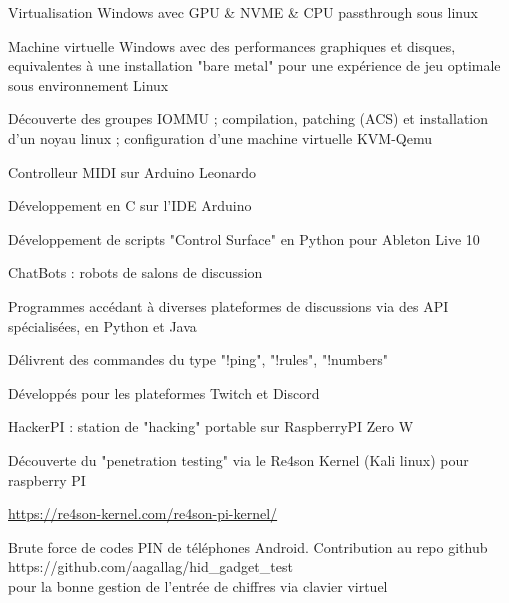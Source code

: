 \begin{cventries}
  \cventry
    {} %
    {Virtualisation Windows avec GPU \& NVME \& CPU passthrough sous linux} %
    {} %
    {} %
    {
      \begin{cvitems} %
        \item {Machine virtuelle Windows avec des performances graphiques et disques, equivalentes à une installation "bare metal" pour une expérience de jeu optimale sous environnement Linux}
        \item {Découverte des groupes IOMMU ; compilation, patching (ACS) et installation d'un noyau linux ; configuration d'une machine virtuelle KVM-Qemu\\}
      \end{cvitems}
    }
  \cventry
    {} %
    {Controlleur MIDI sur Arduino Leonardo} %
    {} %
    {} %
    {
      \begin{cvitems} %
        \item {Développement en C sur l'IDE Arduino}
        \item {Développement de scripts "Control Surface" en Python pour Ableton Live 10\\}
      \end{cvitems}
    }
  \cventry
    {} %
    {ChatBots : robots de salons de discussion} %
    {} %
    {} %
    {
      \begin{cvitems} %
        \item {Programmes accédant à diverses plateformes de discussions via des API spécialisées, en Python et Java}
        \item {Délivrent des commandes du type "!ping", "!rules", "!numbers"}
        \item {Développés pour les plateformes Twitch et Discord\\}
      \end{cvitems}
    }
  \cventry
    {} %
    {HackerPI : station de "hacking" portable sur RaspberryPI Zero W} %
    {} %
    {} %
    {
      \begin{cvitems} %
        \item {Découverte du "penetration testing" via le Re4son Kernel (Kali linux) pour raspberry PI}
        \item {\href{https://re4son-kernel.com/re4son-pi-kernel/}{https://re4son-kernel.com/re4son-pi-kernel/}}
        \item Brute force de codes PIN de téléphones Android. Contribution au repo github https://github.com/aagallag/hid\_gadget\_test\\pour la bonne gestion de l'entrée de chiffres via clavier virtuel\
      \end{cvitems}
    }
\end{cventries}
